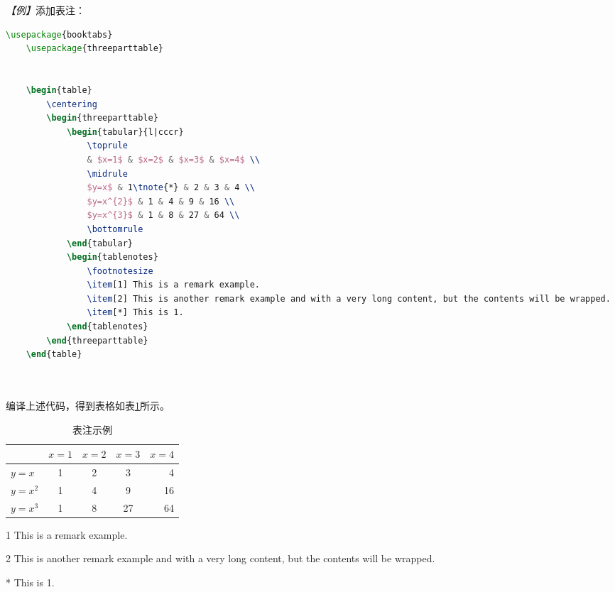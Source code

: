 \emph{【例】}添加表注：
\begin{lstlisting}[language=TeX]
    \usepackage{booktabs}
    \usepackage{threeparttable}
    

    \begin{table}
        \centering
        \begin{threeparttable}
            \begin{tabular}{l|cccr}
                \toprule
                & $x=1$ & $x=2$ & $x=3$ & $x=4$ \\
                \midrule
                $y=x$ & 1\tnote{*} & 2 & 3 & 4 \\
                $y=x^{2}$ & 1 & 4 & 9 & 16 \\
                $y=x^{3}$ & 1 & 8 & 27 & 64 \\
                \bottomrule
            \end{tabular}
            \begin{tablenotes}
                \footnotesize
                \item[1] This is a remark example.
                \item[2] This is another remark example and with a very long content, but the contents will be wrapped.
                \item[*] This is 1.
            \end{tablenotes}
        \end{threeparttable}
    \end{table}

    
\end{lstlisting}

编译上述代码，得到表格如表\ref{tb9}所示。

\begin{table}[htbp]
    \centering
    \begin{threeparttable}
        \begin{tabular}{l|cccr}
            \toprule
                      & $x=1$      & $x=2$ & $x=3$ & $x=4$ \\
            \midrule
            $y=x$     & 1\tnote{*} & 2     & 3     & 4     \\
            $y=x^{2}$ & 1          & 4     & 9     & 16    \\
            $y=x^{3}$ & 1          & 8     & 27    & 64    \\
            \bottomrule
        \end{tabular}
        \begin{tablenotes}
            \footnotesize
            \item[1] This is a remark example.
            \item[2] This is another remark example and with a very long content, but the contents will be wrapped.
            \item[*] This is 1.
        \end{tablenotes}
    \end{threeparttable}
    \caption{表注示例}
    \label{tb9}
\end{table}


